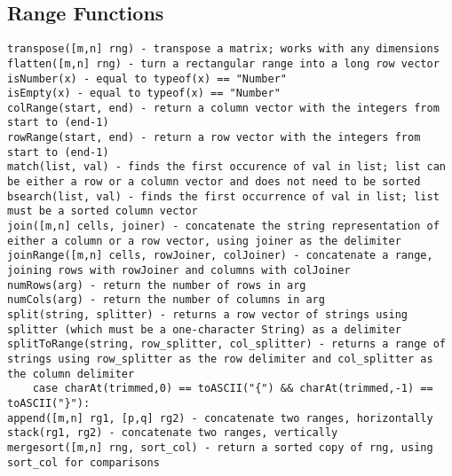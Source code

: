 \subsection{Range Functions}
\begin{lstlisting}
transpose([m,n] rng) - transpose a matrix; works with any dimensions
flatten([m,n] rng) - turn a rectangular range into a long row vector
isNumber(x) - equal to typeof(x) == "Number"
isEmpty(x) - equal to typeof(x) == "Number"
colRange(start, end) - return a column vector with the integers from start to (end-1)
rowRange(start, end) - return a row vector with the integers from start to (end-1)
match(list, val) - finds the first occurence of val in list; list can be either a row or a column vector and does not need to be sorted
bsearch(list, val) - finds the first occurrence of val in list; list must be a sorted column vector
join([m,n] cells, joiner) - concatenate the string representation of either a column or a row vector, using joiner as the delimiter
joinRange([m,n] cells, rowJoiner, colJoiner) - concatenate a range, joining rows with rowJoiner and columns with colJoiner
numRows(arg) - return the number of rows in arg
numCols(arg) - return the number of columns in arg
split(string, splitter) - returns a row vector of strings using splitter (which must be a one-character String) as a delimiter
splitToRange(string, row_splitter, col_splitter) - returns a range of strings using row_splitter as the row delimiter and col_splitter as the column delimiter
    case charAt(trimmed,0) == toASCII("{") && charAt(trimmed,-1) == toASCII("}"):
append([m,n] rg1, [p,q] rg2) - concatenate two ranges, horizontally
stack(rg1, rg2) - concatenate two ranges, vertically
mergesort([m,n] rng, sort_col) - return a sorted copy of rng, using sort_col for comparisons
\end{lstlisting}
